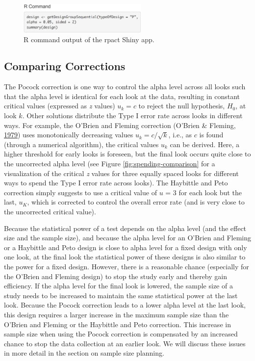 \documentclass[
  english,
  ,man,floatsintext]{apa6}
\begin{document}
\begin{figure}
\includegraphics[width=240px]{seq_images/output_2} \caption{R command output of the rpact Shiny app.}\label{fig:output-2}
\end{figure}

\hypertarget{comparing-corrections}{%
\subsection{Comparing Corrections}\label{comparing-corrections}}

The Pocock correction is one way to control the alpha level across all looks such that the alpha level is identical for each look at the data, resulting in constant critical values (expressed as \emph{z} values) \(u_k = c\) to reject the null hypothesis, \(H_0\), at look \(k\). Other solutions distribute the Type I error rate across looks in different ways. For example, the O'Brien and Fleming correction (O'Brien \& Fleming, \protect\hyperlink{ref-obrien_multiple_1979}{1979}) uses monotonically decreasing values \(u_k = c/\sqrt{k}\), i.e., as \(c\) is found (through a numerical algorithm), the critical values \(u_k\) can be derived. Here, a higher threshold for early looks is foreseen, but the final look occurs quite close to the uncorrected alpha level (see Figure \ref{fig:spending-comparison} for a visualization of the critical \emph{z} values for three equally spaced looks for different ways to spend the Type I error rate across looks). The Haybittle and Peto correction simply suggests to use a critical value of \(u\) = 3 for each look but the last, \(u_K\), which is corrected to control the overall error rate (and is very close to the uncorrected critical value).

Because the statistical power of a test depends on the alpha level (and the effect size and the sample size), and because the alpha level for an O'Brien and Fleming or a Haybittle and Peto design is close to alpha level for a fixed design with only one look, at the final look the statistical power of these designs is also similar to the power for a fixed design. However, there is a reasonable chance (especially for the O'Brien and Fleming design) to stop the study early and thereby gain efficiency. If the alpha level for the final look is lowered, the sample size of a study needs to be increased to maintain the same statistical power at the last look. Because the Pocock correction leads to a lower alpha level at the last look, this design requires a larger increase in the maximum sample size than the O'Brien and Fleming or the Haybittle and Peto correction. This increase in sample size when using the Pocock correction is compensated by an increased chance to stop the data collection at an earlier look. We will discuss these issues in more detail in the section on sample size planning.
\end{document}
